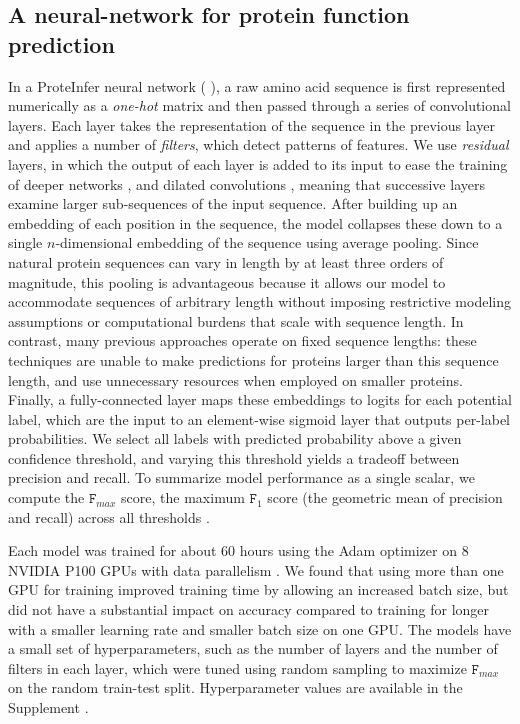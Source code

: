 \subsection*{A neural-network for protein function prediction}
In a ProteInfer neural network (%
), a raw amino acid sequence is first represented numerically as a \textit{one-hot} matrix and then passed through a series of convolutional layers. Each layer takes the representation of the sequence in the previous layer and applies a number of \textit{filters}, which detect patterns of features. We use \textit{residual} layers, in which the output of each layer is added to its input to ease the training of deeper networks \cite{resnet}, and dilated convolutions \cite{dilatedconvolutions}, meaning that successive layers examine larger sub-sequences of the input sequence. After building up an embedding of each position in the sequence, the model collapses these down to a single $n$-dimensional embedding of the sequence using average pooling. Since natural protein sequences can vary in length by at least three orders of magnitude, this pooling is advantageous because it allows our model to accommodate sequences of arbitrary length without imposing restrictive modeling assumptions or computational burdens that scale with sequence length. In contrast, many previous approaches operate on fixed sequence lengths: these techniques are unable to make predictions for proteins larger than this sequence length, and use unnecessary resources when employed on smaller proteins. Finally, a fully-connected layer maps these embeddings to logits for each potential label, which are the input to an element-wise sigmoid layer that outputs per-label probabilities. 
We select all labels with predicted probability above a given confidence threshold, and varying this threshold yields a tradeoff between precision and recall. To summarize model performance as a single scalar, we compute the $\texttt{F}_{max}$ score, the maximum $\texttt{F}_{1}$ score (the geometric mean of precision and recall) across all thresholds \citep{radivojac2013large}.  

Each model was trained for about 60 hours using the Adam optimizer \citep{kingma2014adam} on 8 NVIDIA P100 GPUs with data parallelism \cite{dean2012large, dataparalellism}.  We found that using more than one GPU for training improved training time by allowing an increased batch size, but did not have a substantial impact on accuracy compared to training for longer with a smaller learning rate and smaller batch size on one GPU. The models have a small set of hyperparameters, such as the number of layers and the number of filters in each layer, which were tuned using random sampling to maximize $\texttt{F}_{max}$ on the random train-test split. Hyperparameter values are available in the \textnormal{ Supplement}%
.
